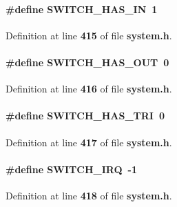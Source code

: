\paragraph[{S\+W\+I\+T\+C\+H\+\_\+\+H\+A\+S\+\_\+\+IN}]{\setlength{\rightskip}{0pt plus 5cm}\#define S\+W\+I\+T\+C\+H\+\_\+\+H\+A\+S\+\_\+\+IN~1}\label{system_8h_a457b1bad1d55eb870d6fb06816b00b66}


Definition at line {\bf 415} of file {\bf system.\+h}.

\paragraph[{S\+W\+I\+T\+C\+H\+\_\+\+H\+A\+S\+\_\+\+O\+UT}]{\setlength{\rightskip}{0pt plus 5cm}\#define S\+W\+I\+T\+C\+H\+\_\+\+H\+A\+S\+\_\+\+O\+UT~0}\label{system_8h_ad53e05b0c0838c37546d44b4a79c6e3e}


Definition at line {\bf 416} of file {\bf system.\+h}.

\paragraph[{S\+W\+I\+T\+C\+H\+\_\+\+H\+A\+S\+\_\+\+T\+RI}]{\setlength{\rightskip}{0pt plus 5cm}\#define S\+W\+I\+T\+C\+H\+\_\+\+H\+A\+S\+\_\+\+T\+RI~0}\label{system_8h_af1647d3bd7f72eb0fee56049bb22d717}


Definition at line {\bf 417} of file {\bf system.\+h}.

\paragraph[{S\+W\+I\+T\+C\+H\+\_\+\+I\+RQ}]{\setlength{\rightskip}{0pt plus 5cm}\#define S\+W\+I\+T\+C\+H\+\_\+\+I\+RQ~-\/1}\label{system_8h_a77d23b869f0be53a31d34b2cae10e041}


Definition at line {\bf 418} of file {\bf system.\+h}.

